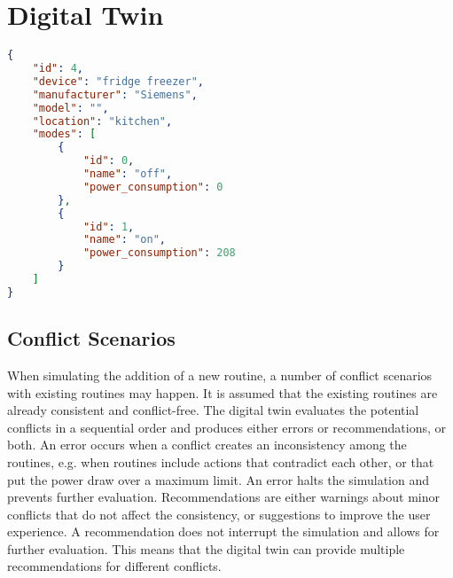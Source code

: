 \chapter{Digital Twin}\label{ch:digital_twin}

\begin{lstlisting}[language=json,caption={JSON file describing the fridge.},label=fridge_json,float,floatplacement=H]
{
    "id": 4,
    "device": "fridge freezer",
    "manufacturer": "Siemens",
    "model": "",
    "location": "kitchen",
    "modes": [
        {
            "id": 0,
            "name": "off",
            "power_consumption": 0
        },
        {
            "id": 1,
            "name": "on",
            "power_consumption": 208
        }
    ]
}
\end{lstlisting}

\section{Conflict Scenarios}

When simulating the addition of a new routine, a number of conflict scenarios with existing routines may happen. It is assumed that the existing routines are already consistent and conflict-free. The digital twin evaluates the potential conflicts in a sequential order and produces either errors or recommendations, or both. An error occurs when a conflict creates an inconsistency among the routines, e.g. when routines include actions that contradict each other, or that put the power draw over a maximum limit. An error halts the simulation and prevents further evaluation. Recommendations are either warnings about minor conflicts that do not affect the consistency, or suggestions to improve the user experience. A recommendation does not interrupt the simulation and allows for further evaluation. This means that the digital twin can provide multiple recommendations for different conflicts.


